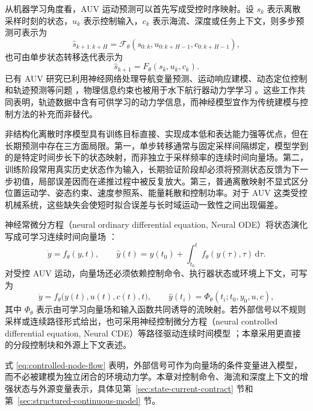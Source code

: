 \documentclass[UTF8,zihao=-4]{ctexrep}
\newcommand{\dd}{\mathrm{d}}
\begin{document}
从机器学习角度看，AUV 运动预测可以首先写成受控时序映射。设 \(s_k\) 表示离散采样时刻的状态，\(u_k\) 表示控制输入，\(c_k\) 表示海流、深度或任务上下文，则多步预测可表示为
\begin{equation}
  \hat s_{k+1:k+H}
  =
  \mathcal{F}_\theta(s_{0:k},u_{0:k+H-1},c_{0:k+H-1}),
  \label{eq:sequence-prediction}
\end{equation}
也可由单步状态转移迭代表示为
\begin{equation}
  \hat s_{k+1}=F_\theta(s_k,u_k,c_k).
  \label{eq:discrete-transition}
\end{equation}
已有 AUV 研究已利用神经网络处理导航变量预测、运动响应建模、动态定位控制和轨迹预测等问题 \citep{song2020auvnavigation,ertogan2024neuraluuv,yao2024auvtrajectory,li2025uuvlstm}，物理信息约束也被用于水下航行器动力学学习 \citep{zhao2024auvpin}。这些工作共同表明，轨迹数据中含有可供学习的动力学信息，而神经模型宜作为传统建模与控制方法的补充而非替代。

非结构化离散时序模型具有训练目标直接、实现成本低和表达能力强等优点，但在长期预测中存在三方面局限。第一，单步转移通常与固定采样间隔绑定，模型学到的是特定时间步长下的状态映射，而非独立于采样频率的连续时间向量场。第二，训练阶段常用真实历史状态作为输入，长期验证阶段却必须将预测状态反馈为下一步初值，局部误差因而在递推过程中被反复放大。第三，普通离散映射不显式区分位置运动学、姿态约束、速度参照系、能量耗散和控制功率。对于 AUV 这类受控机械系统，这些缺失会使短时拟合误差与长时域运动一致性之间出现偏差。

神经常微分方程（neural ordinary differential equation, Neural ODE）将状态演化写成可学习连续时间向量场 \citep{chen2018neuralode}：
\begin{equation}
  \dot y=f_\theta(y,t),
  \qquad
  \hat y(t)=y(t_0)+\int_{t_0}^{t}f_\theta(y(\tau),\tau)\,\dd\tau .
  \label{eq:node-autonomous-basic}
\end{equation}
对受控 AUV 运动，向量场还必须依赖控制命令、执行器状态或环境上下文，可写为
\begin{equation}
  \dot y=f_\theta\bigl(y(t),u(t),c(t),t\bigr),
  \qquad
  \hat y(t_i)=\Phi_\theta(t_i;t_0,y_0,u,c),
  \label{eq:controlled-node-flow}
\end{equation}
其中 \(\Phi_\theta\) 表示由可学习向量场和输入函数共同诱导的流映射。若外部信号以不规则采样或连续路径形式给出，也可采用神经控制微分方程（neural controlled differential equation, Neural CDE）等路径驱动连续时间模型 \citep{kidger2020neuralcde}；本章采用更直接的分段控制块和外源上下文表述。

式 \eqref{eq:controlled-node-flow} 表明，外部信号可作为向量场的条件变量进入模型，而不必被建模为独立闭合的环境动力学。本章对控制命令、海流和深度上下文的增强状态与外源变量表示，具体见第~\ref{sec:state-current-contract} 节和第~\ref{sec:structured-continuous-model} 节。
\end{document}

